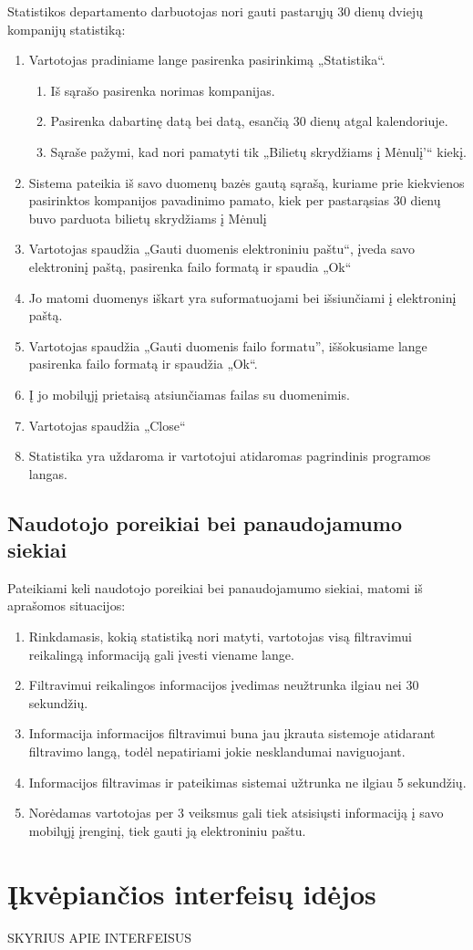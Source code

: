 \documentclass{VUMIFPSkursinis}
\begin{document}
Statistikos departamento darbuotojas nori gauti pastarųjų 30 dienų dviejų kompanijų statistiką:
\begin{enumerate}
\item  Vartotojas pradiniame lange pasirenka pasirinkimą „Statistika“.
\begin{enumerate}[label*=\arabic*.]
\item Iš sąrašo pasirenka norimas kompanijas.
\item Pasirenka dabartinę datą bei datą, esančią 30 dienų atgal kalendoriuje.
\item Sąraše pažymi, kad nori pamatyti tik „Bilietų skrydžiams į Mėnulį'“ kiekį.
\end{enumerate}
\item Sistema pateikia iš savo duomenų bazės gautą sąrašą, kuriame prie kiekvienos pasirinktos kompanijos pavadinimo pamato, kiek per pastarąsias 30 dienų buvo parduota bilietų skrydžiams į Mėnulį
\item Vartotojas spaudžia „Gauti duomenis elektroniniu paštu“, įveda savo elektroninį paštą, pasirenka failo formatą ir spaudia „Ok“
\item Jo matomi duomenys iškart yra suformatuojami bei išsiunčiami į elektroninį paštą.
\item Vartotojas spaudžia „Gauti duomenis failo formatu'', iššokusiame lange pasirenka failo formatą ir spaudžia „Ok“.
\item Į jo mobilųjį prietaisą atsiunčiamas failas su duomenimis.
\item Vartotojas spaudžia „Close“
\item Statistika yra uždaroma ir vartotojui atidaromas pagrindinis programos langas.
\end{enumerate}

\subsection{Naudotojo poreikiai bei panaudojamumo siekiai}
Pateikiami keli naudotojo poreikiai bei panaudojamumo siekiai, matomi iš aprašomos situacijos:

\begin{enumerate}
\item Rinkdamasis, kokią statistiką nori matyti, vartotojas visą filtravimui reikalingą informaciją gali įvesti viename lange.
\item Filtravimui reikalingos informacijos įvedimas neužtrunka ilgiau nei 30 sekundžių.
\item Informacija informacijos filtravimui buna jau įkrauta sistemoje atidarant filtravimo langą, todėl nepatiriami jokie nesklandumai naviguojant.
\item Informacijos filtravimas ir pateikimas sistemai užtrunka ne ilgiau 5 sekundžių.
\item Norėdamas vartotojas per 3 veiksmus gali tiek atsisiųsti informaciją į savo mobilųjį įrenginį, tiek gauti ją elektroniniu paštu.
\end{enumerate}


\section{Įkvėpiančios interfeisų idėjos}
SKYRIUS APIE INTERFEISUS

\printbibliography[heading=bibintoc, title=Šaltiniai]  %
\end{document}
